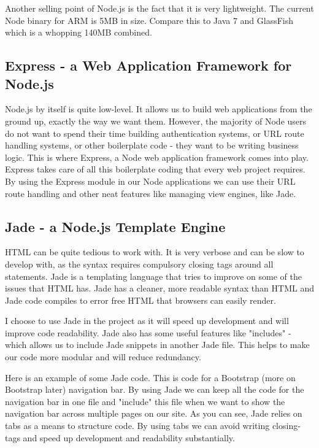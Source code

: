 Another selling point of Node.js is the fact that it is very lightweight. The current Node binary for ARM is 5MB in size. Compare this to Java 7 and GlassFish which is a whopping 140MB combined.


\subsection{Express - a Web Application Framework for Node.js}
Node.js by itself is quite low-level. It allows us to build web applications from the ground up, exactly the way we want them. However, the majority of Node users do not want to spend their time building authentication systems, or URL route handling systems, or other boilerplate code - they want to be writing business logic. This is where Express\cite{express}, a Node web application framework comes into play. Express takes care of all this boilerplate coding that every web project requires. By using the Express module in our Node applications we can use their URL route handling and other neat features like managing view engines, like Jade\cite{jade}.


\subsection{Jade - a Node.js Template Engine}
HTML can be quite tedious to work with. It is very verbose and can be slow to develop with, as the syntax requires compulsory closing tags around all statements. Jade\cite{jade} is a templating language that tries to improve on some of the issues that HTML has. Jade has a cleaner, more readable syntax than HTML and Jade code compiles to error free HTML that browsers can easily render.

I choose to use Jade in the project as it will speed up development and will improve code readability. Jade also has some useful features like "includes" - which allows us to include Jade snippets in another Jade file. This helps to make our code more modular and will reduce redundancy.

Here is an example of some Jade code. This is code for a Bootstrap\cite{Bootstrap} (more on Bootstrap later) navigation bar. By using Jade we can keep all the code for the navigation bar in one file and "include" this file when we want to show the navigation bar across multiple pages on our site. As you can see, Jade relies on tabs as a means to structure code. By using tabs we can avoid writing closing-tags and speed up development and readability substantially. 

